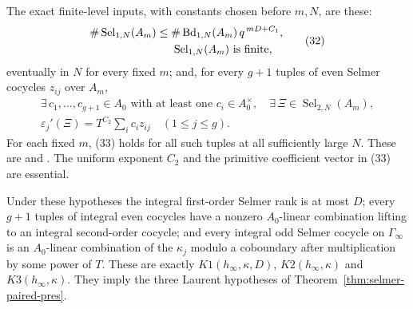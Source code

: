 The exact finite-level inputs, with constants chosen before $m,N$,
are these:
\[
 \begin{split}
 \#\operatorname{Sel}_{1,N}(A_m)
 &\leq
 \#\operatorname{Bd}_{1,N}(A_m)\,q^{\,mD+C_1},\\
 &\hspace{5mm}\operatorname{Sel}_{1,N}(A_m)\text{ is finite},
 \end{split}                                                    \tag{32}
\]
eventually in $N$ for every fixed $m$; and, for every $g+1$
tuples of even Selmer cocycles $z_{ij}$ over $A_m$,
\[
 \begin{gathered}
 \exists\,c_1,\ldots,c_{g+1}\in A_0
       \text{ with at least one }c_i\in A_0^\times,\quad
 \exists\,\Xi\in\operatorname{Sel}_{2,N}(A_m),\\
       \varepsilon_j'(\Xi)=T^{C_2}\sum_i c_i z_{ij}
                             \quad(1\leq j\leq g).
 \end{gathered}                                                   \tag{33}
\]
For each fixed $m$, (33) holds for all such tuples at all
sufficiently large $N$.
These are  and .
The uniform exponent $C_2$ and the primitive coefficient vector
in (33) are essential.

\begin{srproposition}
\label{prop:tw-limit-coh}
Under these hypotheses the integral first-order Selmer rank
is at most $D$; every $g+1$ tuples of integral even cocycles
have a nonzero $A_0$-linear combination lifting to an integral
second-order cocycle; and every integral odd Selmer cocycle
on $\Gamma_\infty$ is an $A_0$-linear combination of the
$\kappa_j$ modulo a coboundary after multiplication by some
power of $T$.
These are exactly $K1(h_\infty,\kappa,D)$,
$K2(h_\infty,\kappa)$ and $K3(h_\infty,\kappa)$.
They imply the three Laurent hypotheses of
Theorem~\ref{thm:selmer-paired-pres}.
\end{srproposition}

